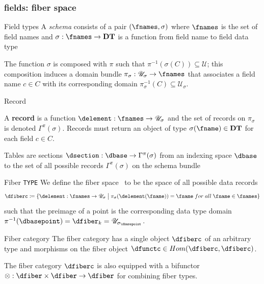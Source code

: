 \documentclass[xcolor={dvipsnames}]{beamer}
\begin{document}
\subsubsection{fields: fiber space \dfiberc}

\begin{frame}{Field types }
   A \textit{schema} consists of a pair $(\fnames, \sigma)$ where $\fnames$ is the set of field names and $\sigma: \fnames \rightarrow \textbf{DT}$ is a function from field name to field data type\cite{spivakSimplicialDatabases2009}

   The function $\sigma$ is composed with $\pi$ such that $\pi^{-1}(\sigma(C)) \subseteq \mathscr{U}$; this composition induces a domain bundle $\pi_{\sigma}:\mathscr{U}_{\sigma} \rightarrow \fnames$ that associates a field name $c \in C$ with its corresponding domain $\pi^{-1}_{\sigma}(C) \subseteq \mathscr{U}_{\sigma}$.

\end{frame}

\begin{frame}{Record}
    \begin{definition} A \textbf{record} is a function $\delement: \fnames \rightarrow \mathscr{U}_{\sigma}$ and the set of records on $\pi_{\sigma}$ is denoted $\Gamma^{\pi}(\sigma)$. Records must return an object of type $\sigma(\fname) \in \textbf{DT}$ for each field $c \in C$.
    \end{definition}

    Tables are sections $\dsection: \dbase \rightarrow \Gamma^{\pi}(\sigma)$ from an indexing space $\dbase$ to the set of all possible records $\Gamma^{\pi}(\sigma)$ on the schema bundle
\end{frame}

\begin{frame}{Fiber \texttt{TYPE} \dfiberc}
    We define the \textcolor{fiber}{fiber space} \dfiberc\ to be the space of all possible data records
    \begin{equation}
      \dfiberc \coloneqq \{\delement: \fnames \rightarrow \mathscr{U}_{\sigma} \bigm{\vert} \pi_{\sigma}(\delement(\fname)) = \fname\;for\;all\; \fname \in \fnames \}
    \end{equation}
    such that the preimage of a point is the corresponding data type domain $\pi^{-1}(\dbasepoint) = \dfiber_{k} = \mathscr{U}_{{\sigma}_{\dbasepoint}}$.
\end{frame}

\begin{frame}{Fiber category \dfiberc}
    The fiber category has a single object $\dfiberc$ of an arbitrary type and morphisms on the fiber object $\dfunctc \in Hom(\dfiberc, \dfiberc)$.

    The fiber category $\mathcal{\dfiberc}$ is also equipped with a bifunctor  $\otimes: \mathcal{\dfiber} \times \mathcal{\dfiber} \rightarrow \mathcal{\dfiber}$ for combining fiber types.
\end{frame}
\end{document}
